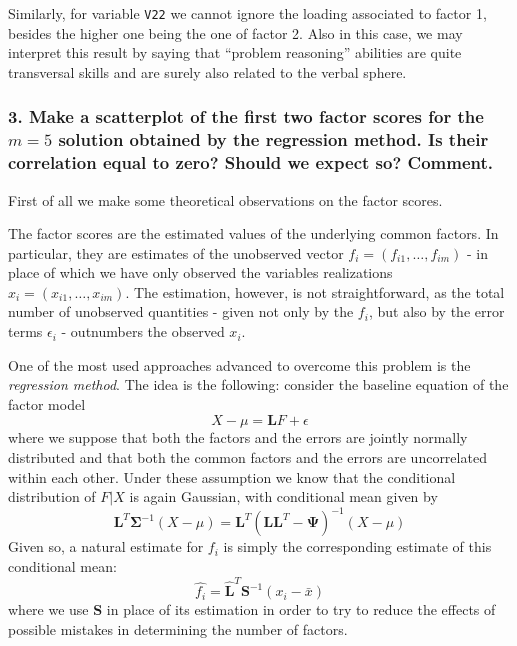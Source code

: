 \documentclass[
  letterpaper,
  DIV=11,
  numbers=noendperiod]{scrartcl}
\begin{document}
Similarly, for variable \texttt{V22} we cannot ignore the loading
associated to factor 1, besides the higher one being the one of factor
2. Also in this case, we may interpret this result by saying that
``problem reasoning'' abilities are quite transversal skills and are
surely also related to the verbal sphere.

\hypertarget{make-a-scatterplot-of-the-first-two-factor-scores-for-the-m-5-solution-obtained-by-the-regression-method.-is-their-correlation-equal-to-zero-should-we-expect-so-comment.}{%
\subsubsection{\texorpdfstring{3. Make a scatterplot of the first two
factor scores for the \(m = 5\) solution obtained by the regression
method. Is their correlation equal to zero? Should we expect so?
Comment.}{3. Make a scatterplot of the first two factor scores for the m = 5 solution obtained by the regression method. Is their correlation equal to zero? Should we expect so? Comment.}}\label{make-a-scatterplot-of-the-first-two-factor-scores-for-the-m-5-solution-obtained-by-the-regression-method.-is-their-correlation-equal-to-zero-should-we-expect-so-comment.}}

First of all we make some theoretical observations on the factor scores.

The factor scores are the estimated values of the underlying common
factors. In particular, they are estimates of the unobserved vector
\(f_i = (f_{i1}, \dots, f_{im})\) - in place of which we have only
observed the variables realizations \(x_i = (x_{i1}, \dots, x_{im})\).
The estimation, however, is not straightforward, as the total number of
unobserved quantities - given not only by the \(f_i\), but also by the
error terms \(\epsilon_i\) - outnumbers the observed \(x_i\).

One of the most used approaches advanced to overcome this problem is the
\emph{regression method}. The idea is the following: consider the
baseline equation of the factor model \[
  X - \mu = \mathbf{L}F + \epsilon
\] where we suppose that both the factors and the errors are jointly
normally distributed and that both the common factors and the errors are
uncorrelated within each other. Under these assumption we know that the
conditional distribution of \(F|X\) is again Gaussian, with conditional
mean given by \[
 \mathbf{L}^T\mathbf{\Sigma}^{-1}(X-\mu) = \mathbf{L}^T(\mathbf{LL}^T -\mathbf{\Psi})^{-1}(X-\mu)
\] Given so, a natural estimate for \(f_i\) is simply the corresponding
estimate of this conditional mean: \[
\hat{f_i} = \hat{\mathbf{L}}^T\mathbf{S}^{-1}(x_i-\bar{x})
\] where we use \(\mathbf{S}\) in place of its estimation in order to
try to reduce the effects of possible mistakes in determining the number
of factors.
\end{document}
